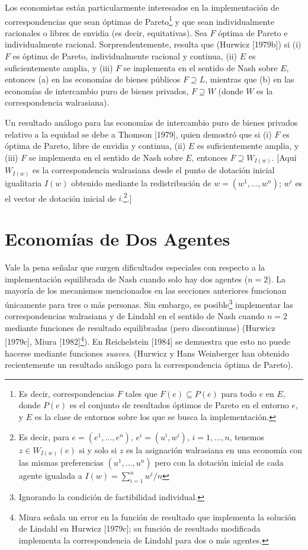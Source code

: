 \documentclass[12pt, letterpaper]{article}
\begin{document}
Los economistas están particularmente interesados en la implementación de correspondencias que sean óptimas de Pareto\footnote{Es decir, correspondencias $F$ tales que $F(e) \subseteq P(e)$ para todo $e$ en $E$, donde $P(e)$ es el conjunto de resultados óptimos de Pareto en el entorno $e$, y $E$ es la clase de entornos sobre los que se busca la implementación.} y que sean individualmente racionales o libres de envidia (es decir, equitativas). Sea $F$ óptima de Pareto e individualmente racional. Sorprendentemente, resulta que (Hurwicz [1979b]) si (i) $F$ es óptima de Pareto, individualmente racional y continua, (ii) $E$ es suficientemente amplia, y (iii) $F$ se implementa en el sentido de Nash sobre $E$, entonces (a) en las economías de bienes públicos $F \supseteq L$, mientras que (b) en las economías de intercambio puro de bienes privados, $F \supseteq W$ (donde $W$ es la correspondencia walrasiana).

Un resultado análogo para las economías de intercambio puro de bienes privados relativo a la equidad se debe a Thomson [1979], quien demostró que si (i) $F$ es óptima de Pareto, libre de envidia y continua, (ii) $E$ es suficientemente amplia, y (iii) $F$ se implementa en el sentido de Nash sobre $E$, entonces $F \supseteq W_{I(w)}$. [Aquí $W_{I(w)}$ es la correspondencia walrasiana desde el punto de dotación inicial igualitaria $I(w)$ obtenido mediante la redistribución de $w = (w^1, \dots, w^n)$; $w^i$ es el vector de dotación inicial de $i$.\footnote{Es decir, para $e = (e^1, \dots, e^n)$, $e^i = (u^i, w^i)$, $i = 1, \dots, n$, tenemos $z \in W_{I(w)}(e)$ si y solo si $z$ es la asignación walrasiana en una economía con las mismas preferencias $(u^1, \dots, u^n)$ pero con la dotación inicial de cada agente igualada a $I(w) = \sum_{i=1}^n w^i/n$}.]

\section*{Economías de Dos Agentes}

Vale la pena señalar que surgen dificultades especiales con respecto a la implementación equilibrada de Nash cuando solo hay dos agentes ($n = 2$). La mayoría de los mecanismos mencionados en las secciones anteriores funcionan únicamente para tres o más personas. Sin embargo, es posible\footnote{Ignorando la condición de factibilidad individual.} implementar las correspondencias walrasiana y de Lindahl en el sentido de Nash cuando $n = 2$ mediante funciones de resultado equilibradas (pero discontinuas) (Hurwicz [1979c], Miura [1982]\footnote{Miura señala un error en la función de resultado que implementa la solución de Lindahl en Hurwicz [1979c]; su función de resultado modificada implementa la correspondencia de Lindahl para dos o más agentes.}). En Reichelstein [1984] se demuestra que esto no puede hacerse mediante funciones \textit{suaves}. (Hurwicz y Hans Weinberger han obtenido recientemente un resultado análogo para la correspondencia óptima de Pareto).
\end{document}
